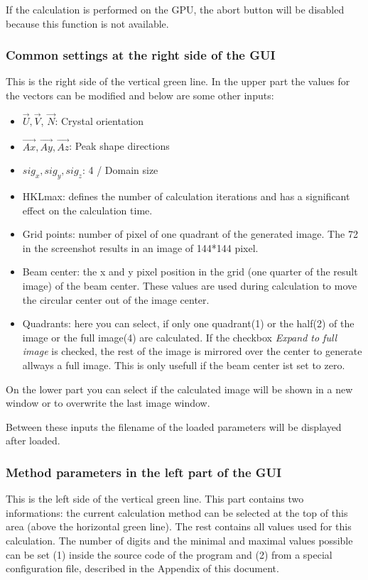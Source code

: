 \documentclass[11pt]{article} %
\begin{document}
If the calculation is performed on the GPU, the abort button will be disabled because this function is not available.

\subsubsection{Common settings at the right side of the GUI}

This is the right side of the vertical green line. In the upper part the values for the vectors can be modified and below are some other inputs:
\begin{itemize}\itemsep0pt
\item $\vec{U}, \vec{V}$, $\vec{N}$: Crystal orientation
\item $\vec{Ax}, \vec{Ay}, \vec{Az}$: Peak shape directions
\item $sig_{x}, sig_{y}, sig_{z}$: 4 / Domain size
\item HKLmax: defines the number of calculation iterations and has a significant effect on the calculation time.
\item Grid points: number of pixel of one quadrant of the generated image. The 72 in the screenshot results in an image of 144*144 pixel.
\item Beam center: the x and y pixel position in the grid (one quarter of the result image) of the beam center. These values are used during calculation to move the circular center out of the image center.
\item Quadrants: here you can select, if only one quadrant(1) or the half(2) of the image or the full image(4) are calculated. If the checkbox {\it Expand to full image} is checked, the rest of the image is mirrored over the center to generate allways a full image. This is only usefull if the beam center ist set to zero.
\end{itemize}

On the lower part you can select if the calculated image will be shown in a new window or to overwrite the last image window.

Between these inputs the filename of the loaded parameters will be displayed after loaded.

\subsubsection{Method parameters in the left part of the GUI}

This is the left side of the vertical green line. This part contains two informations: the current calculation method can be selected at the top of this area (above the horizontal green line). The rest contains all values used for this calculation. The number of digits and the minimal and maximal values possible can be set (1) inside the source code of the program and (2) from a special configuration file, described in the Appendix of this document.
\end{document}
